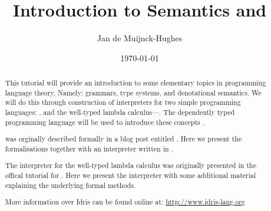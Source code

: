 


\newcommand{\version}{\gitVtagn}

\title{Introduction to Semantics and \idris{}}
\author{Jan de Muijnck-Hughes}
\date{\origdate\today}



\maketitle%
\begin{abstract}
This tutorial will provide an introduction to some elementary topics in programming language theory.
Namely: grammars, type systems, and denotational semantics.
We will do this through construction of interpreters for two simple programming languages: \allang{}, and the well-typed lambda calculus---\lamlang{}.
The dependently typed programming language \idris{} will be used to introduce these concepts \cite{}.

\allang{} was orginally described formally in a blog post entitled .
Here we present the formalisations together with an interpreter written in \idris{}.

The interpreter for the well-typed lambda calculus was originally presented in the offical tutorial for \idris{} \cite{Community2014}.
Here we present the interpreter with some additional material explaining the underlying formal methods.

More information over Idris can be found online at: \url{http://www.idris-lang.org}
\end{abstract}

\newpage
\tableofcontents
\newpage





%





%

%
% 
%

\newpage
\printbibliography{}


